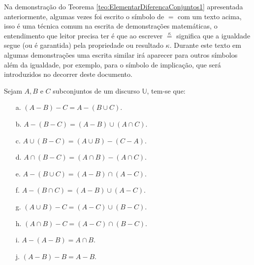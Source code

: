 Na demonstração do Teorema \ref{teo:ElementarDiferencaConjuntos1} apresentada anteriormente, algumas vezes foi escrito o símbolo de $=$ com um texto acima, isso é uma técnica comum na escrita de demonstrações matemáticas, o entendimento que leitor precisa ter é que ao escrever $\stackrel{\kappa}{=}$ significa que a igualdade segue (ou é garantida) pela propriedade ou resultado $\kappa$. Durante este texto em algumas demonstrações uma escrita similar irá aparecer para outros símbolos além da igualdade, por exemplo, para o símbolo de implicação, que será introduzidos no decorrer deste documento.

\begin{teorema}\label{teo:ElementarDiferencaConjuntos2}
	Sejam $A, B$ e $C$ subconjuntos de um discurso $\mathbb{U}$, tem-se que:
	\begin{itemize}
		\item[a.] $(A - B) - C = A - (B \cup C)$.
		\item[b.] $A - (B - C) = (A - B) \cup (A \cap C)$.
		\item[c.] $A \cup (B - C) = (A \cup B) - (C - A)$.
		\item[d.] $A \cap (B - C) = (A \cap B) - (A \cap C)$.
		\item[e.] $A - (B \cup C) = (A - B) \cap (A - C)$.
		\item[f.] $A - (B \cap C) = (A - B) \cup (A - C)$.
		\item[g.] $(A \cup B) - C = (A - C) \cup (B - C)$.
		\item[h.] $(A \cap B) - C = (A - C) \cap (B - C)$.
		\item[i.] $A - (A - B) = A \cap B$.
		\item[j.] $(A - B) - B = A - B$.
	\end{itemize}
\end{teorema}

